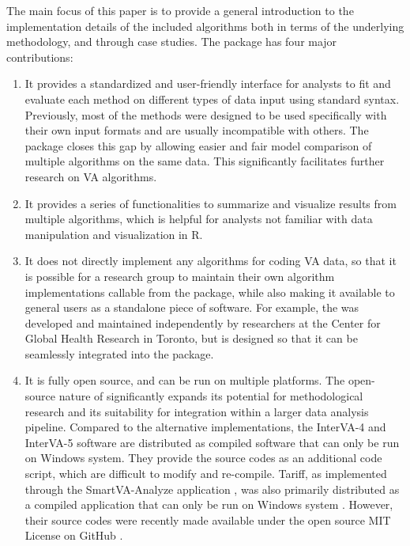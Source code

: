 The main focus of this paper is to provide a general introduction to the
implementation details of the included algorithms both in terms of the
underlying methodology, and through case studies. The 
package has four major contributions:

\begin{enumerate}
\def\labelenumi{\arabic{enumi}.}
\tightlist
\item
  It provides a standardized and user-friendly interface for analysts to
  fit and evaluate each method on different types of data input using
  standard syntax. Previously, most of the methods were designed to be
  used specifically with their own input formats and are usually
  incompatible with others. The  package closes this gap
  by allowing easier and fair model comparison of multiple algorithms on
  the same data. This significantly facilitates further research on VA
  algorithms.
\item
  It provides a series of functionalities to summarize and visualize
  results from multiple algorithms, which is helpful for analysts not
  familiar with data manipulation and visualization in R.
\item
  It does not directly implement any algorithms for coding VA data, so
  that it is possible for a research group to maintain their own
  algorithm implementations callable from the  package,
  while also making it available to general users as a standalone piece
  of software. For example, the  was developed and
  maintained independently by researchers at the Center for Global
  Health Research in Toronto, but is designed so that it can be
  seamlessly integrated into the  package.
\item
  It is fully open source, and can be run on multiple platforms. The
  open-source nature of  significantly expands its
  potential for methodological research and its suitability for
  integration within a larger data analysis pipeline. Compared to the
  alternative implementations, the InterVA-4 and InterVA-5 software are
  distributed as compiled software that can only be run on Windows
  system. They provide the source codes as an additional code script,
  which are difficult to modify and re-compile. Tariff, as implemented
  through the SmartVA-Analyze application \citep{serina2015improving},
  was also primarily distributed as a compiled application that can only
  be run on Windows system \citep{smartVA-web}. However, their source
  codes were recently made available under the open source MIT License
  on GitHub \citep{smartVA-git}.
\end{enumerate}

